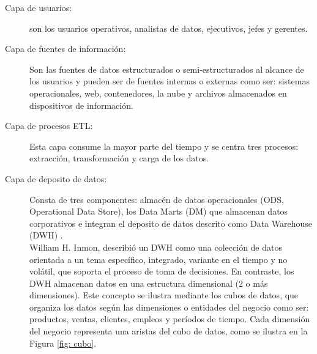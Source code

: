 \documentclass[11pt,titlepage]{report}
\begin{document}
\begin{description}
\item[Capa de usuarios:]  son los usuarios operativos, analistas de datos, ejecutivos, jefes y gerentes.

\item[Capa de fuentes de información:] Son las fuentes de datos estructurados o semi-estructurados al alcance de los usuarios y pueden ser de fuentes internas o externas como ser: sistemas operacionales, web, contenedores, la nube y archivos almacenados en dispositivos de información.

\item[Capa de procesos ETL:] Esta capa consume la mayor parte del tiempo y se centra tres procesos: extracción, transformación y carga de los datos. 

\item[Capa de deposito de datos:] Consta de tres componentes: almacén de
datos operacionales (ODS, Operational Data Store), los Data Marts (DM) que almacenan datos corporativos e integran el deposito de datos descrito como Data Warehouse (DWH) \cite{lib02}.\\

William H. Inmon, describió un DWH como una colección de datos orientada a un tema específico, integrado, variante en el tiempo y no volátil, que soporta el proceso de toma de decisiones. En contraste, los DWH almacenan datos en una estructura dimensional (2 o más dimensiones). Este concepto se ilustra mediante los cubos de datos, que organiza los datos según las dimensiones o
entidades del negocio como ser: productos, ventas, clientes, empleos y períodos de tiempo. Cada dimensión del negocio representa una aristas del cubo de datos, como se ilustra en la Figura \ref{fig: cubo}.


\end{description}
\end{document}
